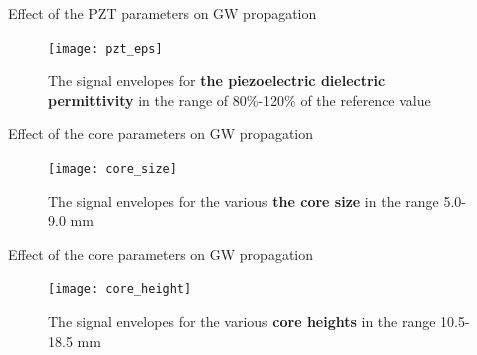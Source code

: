\documentclass[10pt,aspectratio=169]{beamer} %
\begin{document}
\begin{frame}[label=frame25]{Effect of the PZT parameters on GW propagation}
	\begin{figure}
		\begin{center}
			\texttt{[image: pzt\_eps]}
		\end{center}
		\caption{The signal envelopes for \textbf{the piezoelectric dielectric permittivity} in the range of 80\%-120\% of the reference value}
		\label{fig:pzt_eps}
	\end{figure}
\end{frame}

\begin{frame}[label=frame25]{Effect of the core parameters on GW propagation}
	\begin{figure}
		\begin{center}
			\texttt{[image: core\_size]}
		\end{center}
		\caption{The signal envelopes for the various \textbf{the core size} in the range 5.0-9.0 mm}
		\label{fig:core_size}
	\end{figure}
\end{frame}

\begin{frame}[label=frame25]{Effect of the core parameters on GW propagation}
	\begin{figure}
		\begin{center}
			\texttt{[image: core\_height]}
		\end{center}
		\caption{The signal envelopes for the various \textbf{core heights} in the range 10.5-18.5 mm}
		\label{fig:core_height}
	\end{figure}
\end{frame}

\end{document}
